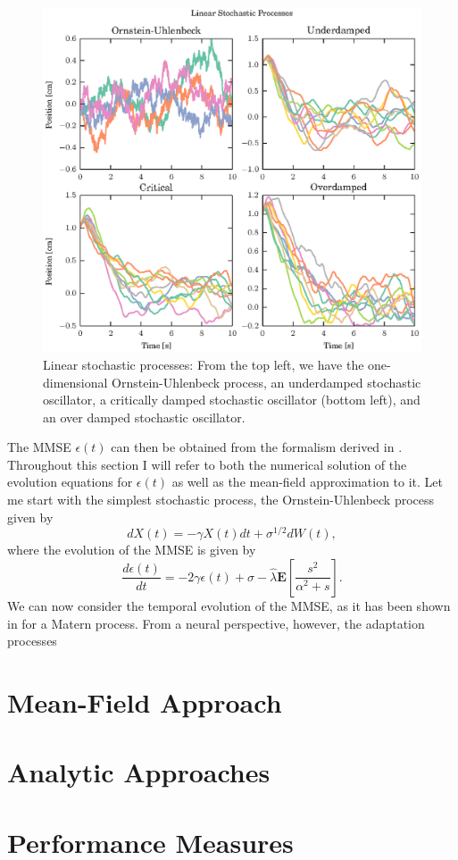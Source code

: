 \begin{figure}
\label{fig:filtering_expl}
\includegraphics[width=\columnwidth]{figures/figure_5_2.eps}
\caption{Linear stochastic processes: From the top left, we have the one-dimensional Ornstein-Uhlenbeck process, an underdamped stochastic oscillator,
a critically damped stochastic oscillator (bottom left), and an over damped stochastic oscillator.}
\end{figure}


The MMSE $\epsilon(t)$ can then be obtained from the formalism derived in . Throughout this section I will refer to both the numerical solution of the
evolution equations for $\epsilon(t)$ as well as the mean-field approximation to it. Let me start with the simplest stochastic process, the Ornstein-Uhlenbeck process
given by
\[
dX(t) = -\gamma X(t) dt + \sigma^{1/2} dW(t),
\]
where the evolution of the MMSE is given by
\[
\frac{d\epsilon(t)}{dt} = -2\gamma \epsilon(t) + \sigma -\hat{\lambda} \boldsymbol{E}\left[\frac{s^2}{\alpha^2+s}\right].
\]
We can now consider the temporal evolution of the MMSE, as it has been shown in  for a Matern process. From a neural perspective, however,
the adaptation processes 

\section{Mean-Field Approach}

\section{Analytic Approaches}

\section{Performance Measures}
